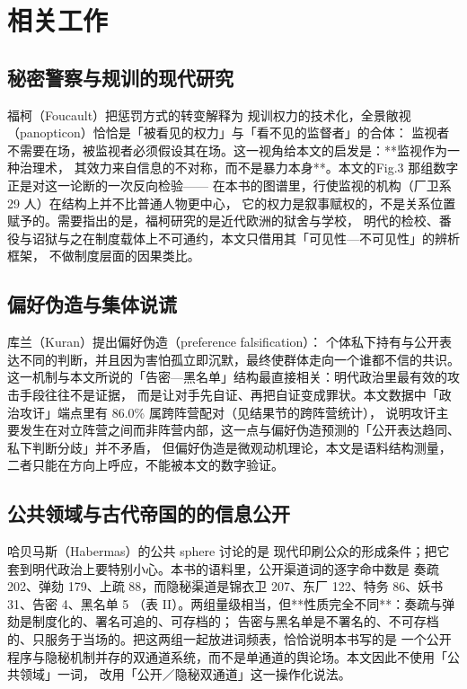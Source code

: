 \section{相关工作}

\subsection{秘密警察与规训的现代研究}福柯（Foucault）\cite{foucault1977}把惩罚方式的转变解释为
规训权力的技术化，全景敞视（panopticon）恰恰是「被看见的权力」与「看不见的监督者」的合体：
监视者不需要在场，被监视者必须假设其在场。这一视角给本文的启发是：**监视作为一种治理术，
其效力来自信息的不对称，而不是暴力本身**。本文的Fig.3 那组数字正是对这一论断的一次反向检验——
在本书的图谱里，行使监视的机构（厂卫系 29 人）在结构上并不比普通人物更中心，
它的权力是叙事赋权的，不是关系位置赋予的。需要指出的是，福柯研究的是近代欧洲的狱舍与学校，
明代的检校、番役与诏狱与之在制度载体上不可通约，本文只借用其「可见性—不可见性」的辨析框架，
不做制度层面的因果类比。

\subsection{偏好伪造与集体说谎}库兰（Kuran）\cite{kuran1995}提出偏好伪造（preference falsification）：
个体私下持有与公开表达不同的判断，并且因为害怕孤立即沉默，最终使群体走向一个谁都不信的共识。
这一机制与本文所说的「告密—黑名单」结构最直接相关：明代政治里最有效的攻击手段往往不是证据，
而是让对手先自证、再把自证变成罪状。本文数据中「政治攻讦」端点里有 86.0\% 属跨阵营配对（见结果节的跨阵营统计），
说明攻讦主要发生在对立阵营之间而非阵营内部，这一点与偏好伪造预测的「公开表达趋同、私下判断分歧」并不矛盾，
但偏好伪造是微观动机理论，本文是语料结构测量，二者只能在方向上呼应，不能被本文的数字验证。

\subsection{公共领域与古代帝国的的信息公开}哈贝马斯（Habermas）\cite{habermas1989}的公共 sphere 讨论的是
现代印刷公众的形成条件；把它套到明代政治上要特别小心。本书的语料里，公开渠道词的逐字命中数是
奏疏 202、弹劾 179、上疏 88，而隐秘渠道是锦衣卫 207、东厂 122、特务 86、妖书 31、告密 4、黑名单 5
（表 II）。两组量级相当，但**性质完全不同**：奏疏与弹劾是制度化的、署名可追的、可存档的；
告密与黑名单是不署名的、不可存档的、只服务于当场的。把这两组一起放进词频表，恰恰说明本书写的是
一个公开程序与隐秘机制并存的双通道系统，而不是单通道的舆论场。本文因此不使用「公共领域」一词，
改用「公开／隐秘双通道」这一操作化说法。

